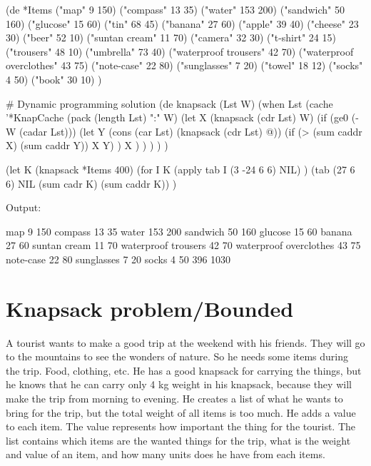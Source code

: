 \begin{wideverbatim}

(de *Items
   ("map" 9 150)                    ("compass" 13 35)
   ("water" 153 200)                ("sandwich" 50 160)
   ("glucose" 15 60)                ("tin" 68 45)
   ("banana" 27 60)                 ("apple" 39 40)
   ("cheese" 23 30)                 ("beer" 52 10)
   ("suntan cream" 11 70)           ("camera" 32 30)
   ("t-shirt" 24 15)                ("trousers" 48 10)
   ("umbrella" 73 40)               ("waterproof trousers" 42 70)
   ("waterproof overclothes" 43 75) ("note-case" 22 80)
   ("sunglasses" 7 20)              ("towel" 18 12)
   ("socks" 4 50)                   ("book" 30 10) )

# Dynamic programming solution
(de knapsack (Lst W)
   (when Lst
      (cache '*KnapCache (pack (length Lst) ":" W)
         (let X (knapsack (cdr Lst) W)
            (if (ge0 (- W (cadar Lst)))
               (let Y (cons (car Lst) (knapsack (cdr Lst) @))
                  (if (> (sum caddr X) (sum caddr Y)) X Y) )
               X ) ) ) ) )

(let K (knapsack *Items 400)
   (for I K
      (apply tab I (3 -24 6 6) NIL) )
   (tab (27 6 6) NIL (sum cadr K) (sum caddr K)) )

Output:

   map                          9   150
   compass                     13    35
   water                      153   200
   sandwich                    50   160
   glucose                     15    60
   banana                      27    60
   suntan cream                11    70
   waterproof trousers         42    70
   waterproof overclothes      43    75
   note-case                   22    80
   sunglasses                   7    20
   socks                        4    50
                              396  1030

\end{wideverbatim}

\pagebreak{}
\section*{Knapsack problem/Bounded}

A tourist wants to make a good trip at the weekend with his friends.
They will go to the mountains to see the wonders of nature. So he needs
some items during the trip. Food, clothing, etc. He has a good knapsack
for carrying the things, but he knows that he can carry only 4 kg weight
in his knapsack, because they will make the trip from morning to
evening. He creates a list of what he wants to bring for the trip, but
the total weight of all items is too much. He adds a value to each item.
The value represents how important the thing for the tourist. The list
contains which items are the wanted things for the trip, what is the
weight and value of an item, and how many units does he have from each
items.

